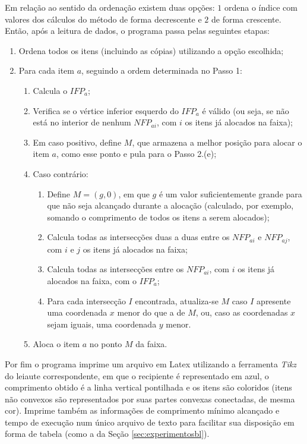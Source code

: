 \documentclass{article}
\begin{document}
Em relação ao sentido da ordenação existem duas opções: $1$ ordena o índice com valores dos cálculos do método de forma decrescente e $2$ de forma crescente. Então, após a leitura de dados, o programa passa pelas seguintes etapas:
\begin{enumerate}
    \item Ordena todos os itens (incluindo as cópias) utilizando a opção escolhida;
    \item Para cada item $a$, seguindo a ordem determinada no Passo 1:
    \begin{enumerate}
        \item Calcula o $IFP_a$;
        \item Verifica se o vértice inferior esquerdo do $IFP_a$ é válido (ou seja, se não está no interior de nenhum $NFP_{ai}$, com $i$ os itens já alocados na faixa);
        \item Em caso positivo, define $M$, que armazena a melhor posição para alocar o item $a$, como esse ponto e pula para o Passo 2.(e);
        \item Caso contrário:
        \begin{enumerate}
            \item Define $M = (g,0)$, em que $g$ é um valor suficientemente grande para que não seja alcançado durante a alocação (calculado, por exemplo, somando o comprimento de todos os itens a serem alocados);
            \item Calcula todas as intersecções duas a duas entre os $NFP_{ai}$ e $NFP_{aj}$, com $i$ e $j$ os itens já alocados na faixa;
            \item Calcula todas as intersecções entre os $NFP_{ai}$, com $i$ os itens já alocados na faixa, com o $IFP_a$;
            \item Para cada intersecção $I$ encontrada, atualiza-se $M$ caso $I$ apresente uma coordenada $x$ menor do que a de $M$, ou, caso as coordenadas $x$ sejam iguais, uma coordenada $y$ menor.
        \end{enumerate}
        \item Aloca o item $a$ no ponto $M$ da faixa.
    \end{enumerate}
\end{enumerate}

Por fim o programa imprime um arquivo em Latex utilizando a ferramenta {\it Tikz} do leiaute correspondente, em que o recipiente é representado em azul, o comprimento obtido é a linha vertical pontilhada e os itens são coloridos (itens não convexos são representados por suas partes convexas conectadas, de mesma cor). Imprime também as informações de comprimento mínimo alcançado e tempo de execução num único arquivo de texto para facilitar sua disposição em forma de tabela (como a da Seção \ref{sec:experimentosbl}).
\end{document}
